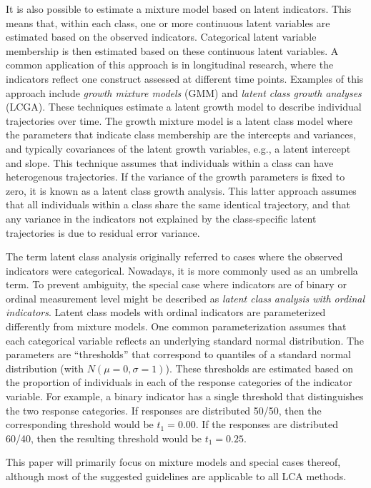 \documentclass[
  ,man,floatsintext]{apa6}
\begin{document}
It is also possible to estimate a mixture model based on latent indicators.
This means that, within each class,
one or more continuous latent variables are estimated based on the observed indicators.
Categorical latent variable membership is then estimated
based on these continuous latent variables.
A common application of this approach is in longitudinal research,
where the indicators reflect one construct assessed at different time points.
Examples of this approach include \emph{growth mixture models} (GMM)
and \emph{latent class growth analyses} (LCGA).
These techniques estimate a latent growth model
to describe individual trajectories over time.
The growth mixture model is a latent class model
where the parameters that indicate class membership
are the intercepts and variances,
and typically covariances of the latent growth variables,
e.g., a latent intercept and slope.
This technique assumes that individuals within a class can have heterogenous trajectories.
If the variance of the growth parameters is fixed to zero,
it is known as a latent class growth analysis.
This latter approach assumes that all individuals within a class
share the same identical trajectory,
and that any variance in the indicators not explained by the class-specific latent trajectories
is due to residual error variance.

The term latent class analysis originally referred to cases
where the observed indicators were categorical.
Nowadays, it is more commonly used as an umbrella term.
To prevent ambiguity, the special case
where indicators are of binary or ordinal measurement level
might be described as \emph{latent class analysis with ordinal indicators}.
Latent class models with ordinal indicators are parameterized differently from mixture models.
One common parameterization assumes that
each categorical variable reflects an underlying standard normal distribution.
The parameters are ``thresholds'' that correspond to quantiles of a standard normal distribution
(with \(N(\mu = 0, \sigma = 1)\)).
These thresholds are estimated based on
the proportion of individuals in each of the response categories of the indicator variable.
For example, a binary indicator has a single threshold that distinguishes the two response categories.
If responses are distributed 50/50, then the corresponding threshold would be \(t_1 = 0.00\).
If the responses are distributed 60/40, then the resulting threshold would be \(t_1 = 0.25\).

This paper will primarily focus on mixture models and special cases thereof,
although most of the suggested guidelines are applicable to all LCA methods.
\end{document}
